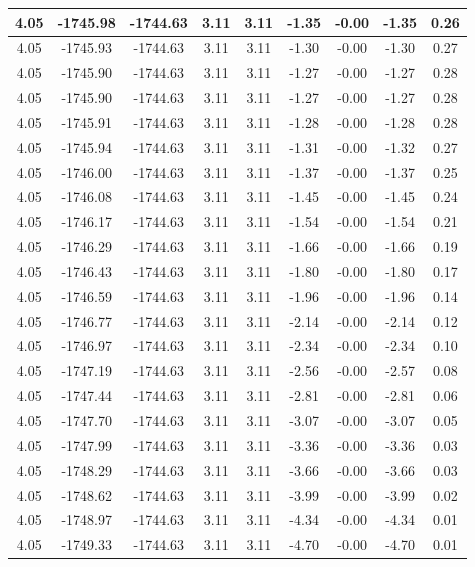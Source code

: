 \begin{table}[htbp]
\begin{adjustbox}{angle=90}
\begin{tabular}{|c|c|c|c|c|c|c|c|c|}
 4.05 & -1745.98 & -1744.63 & 3.11 & 3.11 & -1.35 & -0.00 & -1.35 & 0.26\\ \hline
 4.05 & -1745.93 & -1744.63 & 3.11 & 3.11 & -1.30 & -0.00 & -1.30 & 0.27\\ \hline
 4.05 & -1745.90 & -1744.63 & 3.11 & 3.11 & -1.27 & -0.00 & -1.27 & 0.28\\ \hline
 4.05 & -1745.90 & -1744.63 & 3.11 & 3.11 & -1.27 & -0.00 & -1.27 & 0.28\\ \hline
 4.05 & -1745.91 & -1744.63 & 3.11 & 3.11 & -1.28 & -0.00 & -1.28 & 0.28\\ \hline
 4.05 & -1745.94 & -1744.63 & 3.11 & 3.11 & -1.31 & -0.00 & -1.32 & 0.27\\ \hline
 4.05 & -1746.00 & -1744.63 & 3.11 & 3.11 & -1.37 & -0.00 & -1.37 & 0.25\\ \hline
 4.05 & -1746.08 & -1744.63 & 3.11 & 3.11 & -1.45 & -0.00 & -1.45 & 0.24\\ \hline
 4.05 & -1746.17 & -1744.63 & 3.11 & 3.11 & -1.54 & -0.00 & -1.54 & 0.21\\ \hline
 4.05 & -1746.29 & -1744.63 & 3.11 & 3.11 & -1.66 & -0.00 & -1.66 & 0.19\\ \hline
 4.05 & -1746.43 & -1744.63 & 3.11 & 3.11 & -1.80 & -0.00 & -1.80 & 0.17\\ \hline
 4.05 & -1746.59 & -1744.63 & 3.11 & 3.11 & -1.96 & -0.00 & -1.96 & 0.14\\ \hline
 4.05 & -1746.77 & -1744.63 & 3.11 & 3.11 & -2.14 & -0.00 & -2.14 & 0.12\\ \hline
 4.05 & -1746.97 & -1744.63 & 3.11 & 3.11 & -2.34 & -0.00 & -2.34 & 0.10\\ \hline
 4.05 & -1747.19 & -1744.63 & 3.11 & 3.11 & -2.56 & -0.00 & -2.57 & 0.08\\ \hline
 4.05 & -1747.44 & -1744.63 & 3.11 & 3.11 & -2.81 & -0.00 & -2.81 & 0.06\\ \hline
 4.05 & -1747.70 & -1744.63 & 3.11 & 3.11 & -3.07 & -0.00 & -3.07 & 0.05\\ \hline
 4.05 & -1747.99 & -1744.63 & 3.11 & 3.11 & -3.36 & -0.00 & -3.36 & 0.03\\ \hline
 4.05 & -1748.29 & -1744.63 & 3.11 & 3.11 & -3.66 & -0.00 & -3.66 & 0.03\\ \hline
 4.05 & -1748.62 & -1744.63 & 3.11 & 3.11 & -3.99 & -0.00 & -3.99 & 0.02\\ \hline
 4.05 & -1748.97 & -1744.63 & 3.11 & 3.11 & -4.34 & -0.00 & -4.34 & 0.01\\ \hline
 4.05 & -1749.33 & -1744.63 & 3.11 & 3.11 & -4.70 & -0.00 & -4.70 & 0.01\\ \hline

\end{tabular}
\end{adjustbox}
\end{table}
